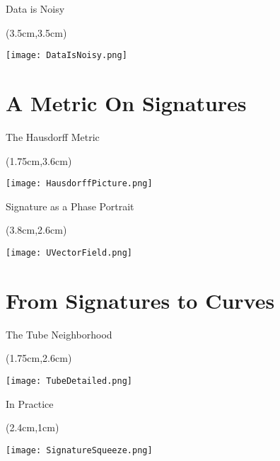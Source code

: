 \documentclass[]{beamer}
\begin{document}
\begin{frame}{Data is Noisy}

\begin{textblock*}{4cm}(3.5cm,3.5cm) %

\texttt{[image: DataIsNoisy.png]}
\end{textblock*}
    
\end{frame}

\section{A Metric On Signatures}

\begin{frame}{The Hausdorff Metric}

\begin{textblock*}{4cm}(1.75cm,3.6cm) %

\texttt{[image: HausdorffPicture.png]}
\end{textblock*}
    
\end{frame}



\begin{frame}{Signature as a Phase Portrait}
    
    \begin{textblock*}{4cm}(3.8cm,2.6cm) %

\texttt{[image: UVectorField.png]}
\end{textblock*}
    
\end{frame}
\section{From Signatures to Curves}

\begin{frame}{The Tube Neighborhood}

\begin{textblock*}{4cm}(1.75cm,2.6cm) %

\texttt{[image: TubeDetailed.png]}
\end{textblock*}
    
\end{frame}


\begin{frame}{In Practice}
    
\begin{textblock*}{4cm}(2.4cm,1cm) %

\texttt{[image: SignatureSqueeze.png]}

\end{textblock*}
    
\end{frame}
\end{document}
